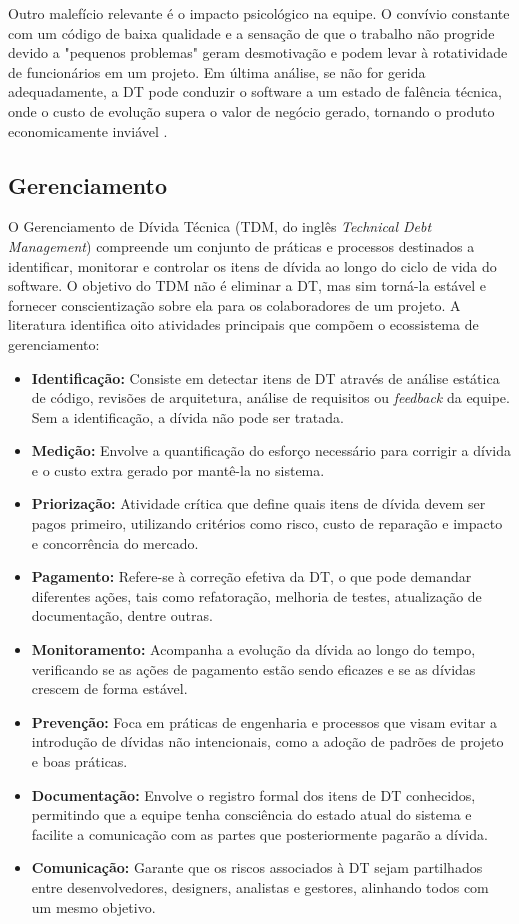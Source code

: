 \documentclass[12pt,openright,oneside,a4paper,brazil]{abntex2}
\begin{document}
Outro malefício relevante é o impacto psicológico na equipe. O convívio constante com um código de baixa qualidade e a sensação de que o trabalho não progride devido a "pequenos problemas" geram desmotivação e podem levar à rotatividade de funcionários em um projeto. Em última análise, se não for gerida adequadamente, a DT pode conduzir o software a um estado de falência técnica, onde o custo de evolução supera o valor de negócio gerado, tornando o produto economicamente inviável \cite{RIOS2018117,MELO2022111483}.

\subsection{Gerenciamento}

O Gerenciamento de Dívida Técnica (TDM, do inglês \textit{Technical Debt Management}) compreende um conjunto de práticas e processos destinados a identificar, monitorar e controlar os itens de dívida ao longo do ciclo de vida do software. O objetivo do TDM não é eliminar a DT, mas sim torná-la estável e fornecer conscientização sobre ela para os colaboradores de um projeto. A literatura identifica oito atividades principais que compõem o ecossistema de gerenciamento:

\begin{itemize}
    \item \textbf{Identificação:} Consiste em detectar itens de DT através de análise estática de código, revisões de arquitetura, análise de requisitos ou \textit{feedback} da equipe. Sem a identificação, a dívida não pode ser tratada.
    \item \textbf{Medição:} Envolve a quantificação do esforço necessário para corrigir a dívida e o custo extra gerado por mantê-la no sistema.
    \item \textbf{Priorização:} Atividade crítica que define quais itens de dívida devem ser pagos primeiro, utilizando critérios como risco, custo de reparação e impacto e concorrência do mercado.
    \item \textbf{Pagamento:} Refere-se à correção efetiva da DT, o que pode demandar diferentes ações, tais como refatoração, melhoria de testes, atualização de documentação, dentre outras.
    \item \textbf{Monitoramento:} Acompanha a evolução da dívida ao longo do tempo, verificando se as ações de pagamento estão sendo eficazes e se as dívidas crescem de forma estável.
    \item \textbf{Prevenção:} Foca em práticas de engenharia e processos que visam evitar a introdução de dívidas não intencionais, como a adoção de padrões de projeto e boas práticas.
    \item \textbf{Documentação:} Envolve o registro formal dos itens de DT conhecidos, permitindo que a equipe tenha consciência do estado atual do sistema e facilite a comunicação com as partes que posteriormente pagarão a dívida.
    \item \textbf{Comunicação:} Garante que os riscos associados à DT sejam partilhados entre desenvolvedores, designers, analistas e gestores, alinhando todos com um mesmo objetivo.
\end{itemize}
\end{document}
